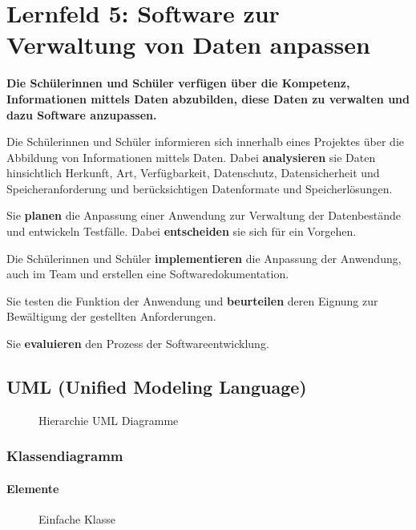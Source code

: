 \chapter{Lernfeld 5: Software zur Verwaltung von Daten anpassen}

\textbf{Die Schülerinnen und Schüler verfügen über die Kompetenz, Informationen mittels
    Daten abzubilden, diese Daten zu verwalten und dazu Software anzupassen.}

Die Schülerinnen und Schüler informieren sich innerhalb eines Projektes über die Abbildung
von Informationen mittels Daten. Dabei \textbf{analysieren} sie Daten hinsichtlich Herkunft, Art,
Verfügbarkeit, Datenschutz, Datensicherheit und Speicheranforderung und berücksichtigen
Datenformate und Speicherlösungen.

Sie \textbf{planen} die Anpassung einer Anwendung zur Verwaltung der Datenbestände und entwickeln Testfälle. Dabei \textbf{entscheiden} sie sich für ein Vorgehen.

Die Schülerinnen und Schüler \textbf{implementieren} die Anpassung der Anwendung, auch im
Team und erstellen eine Softwaredokumentation.

Sie testen die Funktion der Anwendung und \textbf{beurteilen} deren Eignung zur Bewältigung der
gestellten Anforderungen.

Sie \textbf{evaluieren} den Prozess der Softwareentwicklung.


\section{UML (Unified Modeling Language)}

\begin{figure}[H]
    \centering
    
    \caption{Hierarchie UML Diagramme}
\end{figure}
\FloatBarrier

\subsection{Klassendiagramm}

\subsubsection{Elemente}

\begin{figure}[H]
    \centering
    
    \caption{Einfache Klasse}
\end{figure}
\FloatBarrier

